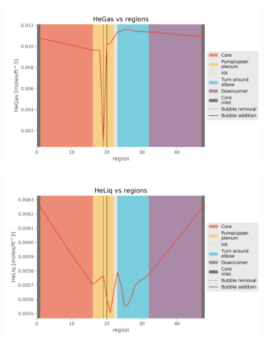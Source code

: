 \begin{figure}[ht] 
\centering
\begin{minipage}{.5\textwidth}
  \centering
  \includegraphics[width=1.0\linewidth]{images/BaseCaseHeGas.png}
  \label{fig:BaseCaseHeGas}
\end{minipage}%
\begin{minipage}{.5\textwidth}
  \centering
  \includegraphics[width=1.0\linewidth]{images/BaseCaseHeLiq.png}
  \label{fig:BaseCaseHeLiq}
\end{minipage}
\end{figure}

